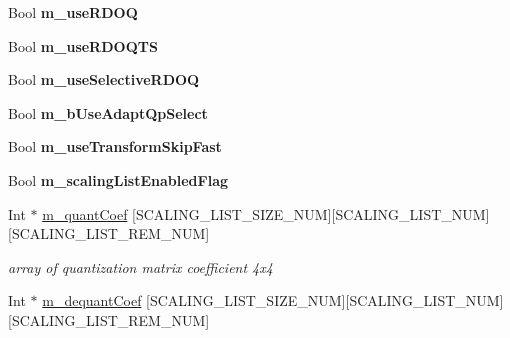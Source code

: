 \begin{DoxyCompactItemize}
\mbox{\label{class_t_com_tr_quant_abb1f41a936001c286bd4367679a1d6e5}} 
Bool {\bfseries m\+\_\+use\+R\+D\+OQ}
\item 
\mbox{\label{class_t_com_tr_quant_ada84899f0f0dd759febf11cf5fb4f7f8}} 
Bool {\bfseries m\+\_\+use\+R\+D\+O\+Q\+TS}
\item 
\mbox{\label{class_t_com_tr_quant_a10e8510b5bf7a94110cb80bc4aabcd2b}} 
Bool {\bfseries m\+\_\+use\+Selective\+R\+D\+OQ}
\item 
\mbox{\label{class_t_com_tr_quant_a690c17e42cb34d9afc405610081aea95}} 
Bool {\bfseries m\+\_\+b\+Use\+Adapt\+Qp\+Select}
\item 
\mbox{\label{class_t_com_tr_quant_a5ffb734982d55a6d3537733b425a3a2e}} 
Bool {\bfseries m\+\_\+use\+Transform\+Skip\+Fast}
\item 
\mbox{\label{class_t_com_tr_quant_ad21551ab99a4cb2380d0967411e8a8c2}} 
Bool {\bfseries m\+\_\+scaling\+List\+Enabled\+Flag}
\item 
\mbox{\label{class_t_com_tr_quant_af02d6dd667014d6a26a10565fd975fc6}} 
Int $\ast$ \hyperlink{class_t_com_tr_quant_af02d6dd667014d6a26a10565fd975fc6}{m\+\_\+quant\+Coef} \mbox{[}S\+C\+A\+L\+I\+N\+G\+\_\+\+L\+I\+S\+T\+\_\+\+S\+I\+Z\+E\+\_\+\+N\+UM\mbox{]}\mbox{[}S\+C\+A\+L\+I\+N\+G\+\_\+\+L\+I\+S\+T\+\_\+\+N\+UM\mbox{]}\mbox{[}S\+C\+A\+L\+I\+N\+G\+\_\+\+L\+I\+S\+T\+\_\+\+R\+E\+M\+\_\+\+N\+UM\mbox{]}
\begin{DoxyCompactList}\small\item\em array of quantization matrix coefficient 4x4 \end{DoxyCompactList}\item 
\mbox{\label{class_t_com_tr_quant_acaaa227022504c40deb3898dca6df5ba}} 
Int $\ast$ \hyperlink{class_t_com_tr_quant_acaaa227022504c40deb3898dca6df5ba}{m\+\_\+dequant\+Coef} \mbox{[}S\+C\+A\+L\+I\+N\+G\+\_\+\+L\+I\+S\+T\+\_\+\+S\+I\+Z\+E\+\_\+\+N\+UM\mbox{]}\mbox{[}S\+C\+A\+L\+I\+N\+G\+\_\+\+L\+I\+S\+T\+\_\+\+N\+UM\mbox{]}\mbox{[}S\+C\+A\+L\+I\+N\+G\+\_\+\+L\+I\+S\+T\+\_\+\+R\+E\+M\+\_\+\+N\+UM\mbox{]}

\end{DoxyCompactItemize}
